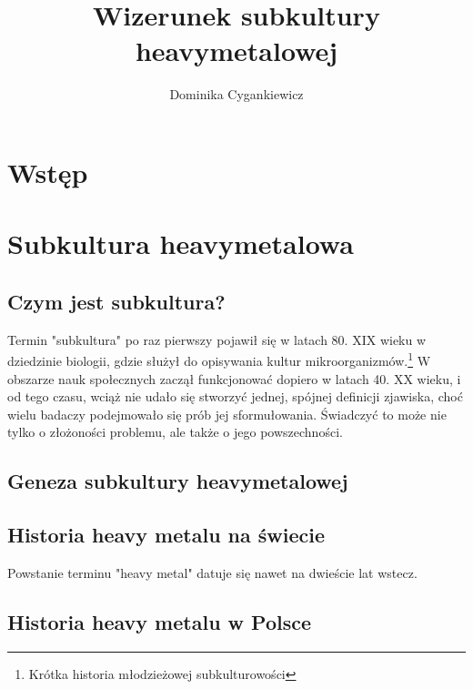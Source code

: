 \documentclass[12pt, a4paper, titlepage]{report}
\title{\textbf{Wizerunek subkultury heavymetalowej}}
\author{Dominika Cygankiewicz}
\date{}
\begin{document}
	
\maketitle
\tableofcontents
\thispagestyle {empty}
\newpage

\chapter*{Wstęp}

\chapter{Subkultura heavymetalowa}
\section{Czym jest subkultura?}
Termin "subkultura" po raz pierwszy pojawił się w latach 80. XIX wieku w dziedzinie biologii, gdzie służył do opisywania kultur mikroorganizmów.\footnote{Krótka historia młodzieżowej subkulturowości} W obszarze nauk społecznych zaczął funkcjonować dopiero w latach 40. XX wieku, i od tego czasu, wciąż nie udało się stworzyć jednej, spójnej definicji zjawiska, choć wielu badaczy podejmowało się prób jej sformułowania. %
Świadczyć to może nie tylko o złożoności  problemu, ale także o jego powszechności. %




\newpage
\section{Geneza subkultury heavymetalowej}

\section{Historia heavy metalu na świecie}
Powstanie terminu "heavy metal" datuje się nawet na dwieście lat wstecz. 
\section{Historia heavy metalu w Polsce}
\end{document}

